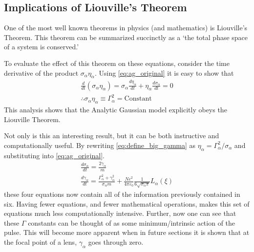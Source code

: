 \subsection{Implications of Liouville's Theorem}

One of the most well known theorems in physics (and mathematics) is Liouville's Theorem.
This theorem can be summarized succinctly as a `the total phase space of a system is conserved.'

To evaluate the effect of this theorem on these equations, consider the time derivative of the product $\sigma_{\alpha} \eta_{\alpha}$.
Using \ref{eq:ag_original} it is easy to show that
\begin{gather}
  \frac{d}{dt} (\sigma_{\alpha} \eta_{\alpha}) = \sigma_{\alpha} \frac{d \eta_{\alpha}}{dt} + \eta_{\alpha} \frac{d \sigma_{\alpha}}{dt} = 0\\
  \label{eq:define_big_gamma}
  \therefore \sigma_{\alpha} \eta_{\alpha} \equiv \Gamma_{\alpha}^2 = \text{Constant}
\end{gather}
This analysis shows that the Analytic Gaussian model explicitly obeys the Liouville Theorem.

Not only is this an interesting result, but it can be both instructive and computationally useful.
By rewriting \ref{eq:define_big_gamma} as $\eta_{\alpha} = \Gamma_{\alpha}^2 / \sigma_{\alpha}$ and substituting into \ref{eq:ag_original}.
\begin{subequations} \label{eq:ag_big_gamma}
\begin{gather}
  \frac{d\sigma_{\alpha}}{dt} = \frac{2\gamma_{\alpha}}{m} \\
  \frac{d\gamma_{\alpha}}{dt} = \frac{ \Gamma_{\alpha}^2 + \gamma_{\alpha}^2 }{\sigma_{\alpha} m}
    + \frac{N e^2}{4\pi\varepsilon_0} \frac{1}{6 \sqrt{\sigma_{\alpha}\pi}} L_{\alpha}(\xi)
\end{gather}
\end{subequations}
these four equations now contain all of the information previously contained in six. Having fewer equations, and fewer mathematical operations, makes this set of equations much less computationally intensive.
Further, now one can see that these $\Gamma$ constants can be thought of as some minimum/intrinsic action of the pulse. 
This will become more apparent when in future sections
it is shown that at the focal point of a lens, $\gamma_{\alpha}$ goes through zero.
